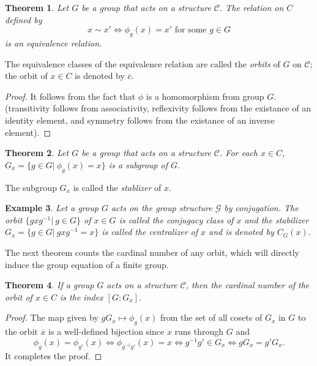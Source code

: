 \documentclass{assignment}[2019/10/15]
\theoremstyle{plain}
\newtheorem{theorem}{Theorem}[section]
\newtheorem{example}[theorem]{Example}
\begin{document}
    \begin{theorem}
        Let $G$ be a group that acts on a structure $\mathcal{C}$. The relation on $C$ defined by
        \begin{equation}
            x\sim x' \Longleftrightarrow \phi_g(x) = x'\text{ for some }g\in G
        \end{equation}
        is an equivalence relation.
    \end{theorem}

    The equivalence classes of the equivalence relation are called the \emph{orbits} of $G$ on $\mathcal{C}$; the orbit of $x\in C$ is denoted by $\overline{c}$.

    \begin{proof}
        It follows from the fact that $\phi$ is a homomorphism from group $G$. (transitivity follows from associativity, reflexivity follows from the existance of an identity element, and symmetry follows from the existance of an inverse element).
    \end{proof}

    \begin{theorem}
        Let $G$ be a group that acts on a structure $\mathcal{C}$. For each $x\in C$, $G_x=\{g\in G|\ \phi_g(x) = x\}$ is a subgroup of $G$.
    \end{theorem}

    The subgroup $G_x$ is called the \emph{stablizer} of $x$.

    \begin{example}
        Let a group $G$ acts on the group structure $\mathcal{G}$ by conjugation. The orbit $\{gxg^{-1}|\ g\in G\}$ of $x\in G$ is called the \emph{conjugacy class} of $x$ and the stabilizer $G_x=\{g\in G|\ gxg^{-1} = x\}$ is called the \emph{centralizer} of $x$ and is denoted by $C_G(x)$.
    \end{example}

    The next theorem counts the cardinal number of any orbit, which will directly induce the group equation of a finite group.

    \begin{theorem}
        If a group $G$ acts on a structure $\mathcal{C}$, then the cardinal number of the orbit of $x\in C$ is the index $[G:G_x]$.
    \end{theorem}

    \begin{proof}
        The map given by $gG_x\mapsto \phi_g(x)$ from the set of all cosets of $G_x$ in $G$ to the orbit $\overline{x}$ is a well-defined bijection since $x$ runs through $G$ and
        \begin{equation}
            \phi_g(x)=\phi_{g'}(x)\Longleftrightarrow \phi_{g^{-1}g'}(x)=x\Longleftrightarrow g^{-1}g'\in G_x\Longleftrightarrow gG_x = g'G_x.
        \end{equation}
        It completes the proof.
    \end{proof}
\end{document}
